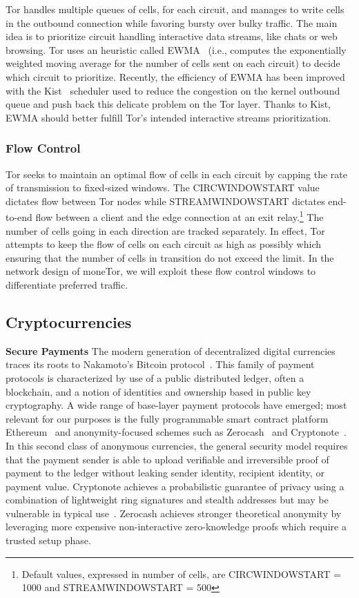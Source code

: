 Tor handles multiple queues of cells, for each circuit, and manages to write
cells in the outbound connection while favoring bursty over bulky traffic. The
main idea is to prioritize circuit handling interactive data streams, like chats
or web browsing. Tor uses an heuristic called EWMA~\cite{ccs10-scheduling}
(i.e., computes the exponentially weighted moving average for the number of
cells sent on each circuit) to decide which circuit to prioritize. Recently, the
efficiency of EWMA has been improved with the Kist~\cite{jansen14-kist}
scheduler used to reduce the congestion on the kernel outbound queue and push
back this delicate problem on the Tor layer. Thanks to Kist, EWMA should better
fulfill Tor's intended interactive streams prioritization. 

\subsubsection{Flow Control} Tor seeks to maintain an optimal flow of cells in each
circuit by capping the rate of transmission to fixed-sized windows. The
CIRCWINDOWSTART value dictates flow between Tor nodes while
STREAMWINDOWSTART dictates end-to-end flow between a client and the edge
connection at an exit relay.\footnote{Default values, expressed in number of
  cells, are CIRCWINDOWSTART = 1000 and STREAMWINDOWSTART = 500} The number
of cells going in each direction are tracked separately. In effect, Tor attempts
to keep the flow of cells on each circuit as high as possibly which ensuring
that the number of cells in transition do not exceed the limit. In the network
design of moneTor, we will exploit these flow control windows to differentiate
preferred traffic.

\subsection{Cryptocurrencies}

\textbf{Secure Payments} The modern generation of decentralized digital
currencies traces its roots to Nakamoto's Bitcoin
protocol~\cite{nakamoto2008bitcoin}. This family of payment protocols is
characterized by use of a public distributed ledger, often a blockchain, and a
notion of identities and ownership based in public key cryptography. A wide
range of base-layer payment protocols have emerged; most relevant for our
purposes is the fully programmable smart contract platform
Ethereum~\cite{wood2014ethereum} and anonymity-focused schemes such as
Zerocash~\cite{sasson2014zerocash} and Cryptonote~\cite{van2013cryptonote}. In
this second class of anonymous currencies, the general security model requires
that the payment sender is able to upload verifiable and irreversible proof of
payment to the ledger without leaking sender identity, recipient identity, or
payment value. Cryptonote achieves a probabilistic guarantee of privacy using a
combination of lightweight ring signatures and stealth addresses but may be
vulnerable in typical use~\cite{miller2017empirical}. Zerocash achieves stronger
theoretical anonymity by leveraging more expensive non-interactive
zero-knowledge proofs which require a trusted setup phase.

